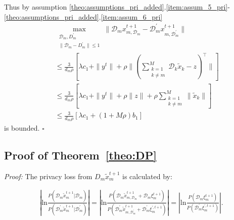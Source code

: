 Thus by assumption \ref{theo:assumptions_pri_added}.\ref{item:assum_5_pri}-\ref{theo:assumptions_pri_added}.\ref{item:assum_6_pri}
\begin{eqnarray*}
&&\max_{\substack{\mathcal{D}_m,D_m^{\prime}\\
\|\mathcal{D}_m-D_m^{\prime}\|\leq1
}}
\|\mathcal{D}_mx_{m,\mathcal{D}_m}^{t+1}-\mathcal{D}_m^{\prime}x_{m,\mathcal{D}_m^{\prime}}^{t+1}\|\\
&&\leq\frac{3}{d_m\rho}\left[\lambda c_1+\|y^t\|+\rho\|(\sum_{\substack
{k=1\\k\neq m}}^{M}\mathcal{D}_k\tilde{x}_k-z)^\top\|\right]\\
&&\leq\frac{3}{d_m\rho}\left[\lambda c_1+\|y^t\|+\rho\|z\|
+\rho\sum_{\substack
{k=1\\k\neq m}}^{M}\|\tilde{x}_k\|\right]\\
&&\leq\frac{3}{d_m\rho}\left[\lambda c_1+(1+M\rho)b_1\right]
\end{eqnarray*}
is bounded.
\hfill$\square$

\subsection{Proof of Theorem~\ref{theo:DP}}

{\it Proof:} The privacy loss from $D_m\tilde{x}_m^{t+1}$ is calculated by:

\begin{eqnarray*}
  \left|
  \text{ln}\frac{P(\mathcal{D}_m\tilde{x}_m^{t+1}|\mathcal{D}_m)}{P(\mathcal{D}_m^{\prime}\tilde{x}_m^{t+1}|\mathcal{D}_m^{\prime})}
  \right|=
  \left|
  \text{ln}\frac{P(\mathcal{D}_m\tilde{x}_{m,\mathcal{D}_m}^{t+1}+\mathcal{D}_m\xi_m^{t+1})}
  {P(\mathcal{D}_m^{\prime}\tilde{x}_{m,\mathcal{D}_m^{\prime}}^{t+1}+\mathcal{D}_m^{\prime}\xi_m^{\prime,t+1})}
  \right|=
    \left|
  \text{ln}\frac{P(\mathcal{D}_m\xi_m^{t+1})}
  {P(\mathcal{D}_m^{\prime}\xi_m^{\prime,t+1})}
  \right|.
\end{eqnarray*}

